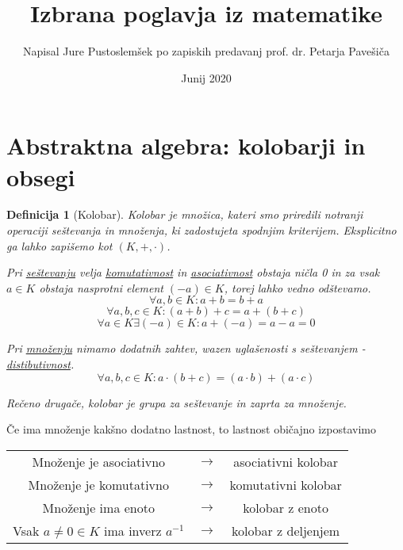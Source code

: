 \documentclass[11pt, a4paper]{article}
\begin{document}
    \newtheorem{theorem}{Izrek}[section]
    \newtheorem{definition}[theorem]{Definicija}
    \newtheorem{corollary}[theorem]{Posledica}
    \newtheorem{lemma}[theorem]{Lema}
    \newtheorem{proposition}[theorem]{Trditev}
    \newtheorem{example}[theorem]{Zgled}

    \newtheorem*{remark}{Opomba}


    \title{Izbrana poglavja iz matematike}
    \author{Napisal Jure Pustoslemšek po zapiskih predavanj prof. dr. Petarja Pavešiča}
    \date{Junij 2020}
    \maketitle

    \section{Abstraktna algebra: kolobarji in obsegi}

    \begin{definition}[Kolobar]
        Kolobar je množica, kateri smo priredili notranji operaciji seštevanja in množenja, ki zadostujeta spodnjim kriterijem. Eksplicitno ga lahko zapišemo kot \((K,+,\cdot)\).
        \par
        Pri \underline{seštevanju} velja \underline{komutativnost} in \underline{asociativnost} obstaja ničla 0 in za vsak \(a \in K\) obstaja nasprotni element \((-a) \in K\), torej lahko vedno odštevamo.
        \[\forall a,b \in K: a + b = b + a\]
        \[\forall a,b,c \in K: (a + b) + c = a + (b + c)\]
        \[\forall a \in K \exists (-a) \in K: a + (-a) = a - a = 0\]
        
        \par
        Pri \underline{množenju} nimamo dodatnih zahtev, wazen uglašenosti s seštevanjem - \underline{distibutivnost}.
        \[\forall a,b,c \in K: a \cdot (b+c) = (a \cdot b) + (a \cdot c)\]

        Rečeno drugače, kolobar je grupa za seštevanje in zaprta za množenje.
    \end{definition}

    Če ima množenje kakšno dodatno lastnost, to lastnost običajno izpostavimo\
    \begin{center}
        \begin{tabular}{ c c c }
            Množenje je asociativno & \(\rightarrow\) & asociativni kolobar \\
            Množenje je komutativno & \(\rightarrow\) & komutativni kolobar \\
            Množenje ima enoto & \(\rightarrow\) & kolobar z enoto \\
            Vsak \(a \neq 0 \in K\) ima inverz \(a^{-1}\) & \(\rightarrow\) & kolobar z deljenjem
        \end{tabular}        
    \end{center}
\end{document}
